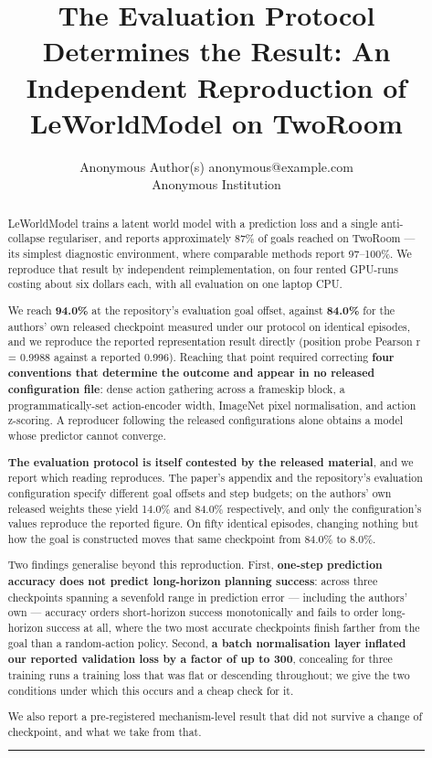 \documentclass[10pt]{article}
\title{The Evaluation Protocol Determines the Result: An Independent Reproduction of LeWorldModel on TwoRoom}
\author{\name Anonymous Author(s) \email anonymous@example.com \\
      \addr Anonymous Institution}
\begin{document}
\maketitle

\begin{abstract}
LeWorldModel trains a latent world model with a prediction loss and a single
anti-collapse regulariser, and reports approximately 87\% of goals reached on
TwoRoom --- its simplest diagnostic environment, where comparable methods report
97--100\%. We reproduce that result by independent reimplementation, on four
rented GPU-runs costing about six dollars each, with all evaluation on one
laptop CPU.

We reach \textbf{94.0\%} at the repository's evaluation goal offset, against \textbf{84.0\%}
for the authors' own released checkpoint measured under our protocol on
identical episodes, and we reproduce the reported representation result directly
(position probe Pearson r = 0.9988 against a reported 0.996). Reaching that
point required correcting \textbf{four conventions that determine the outcome and
appear in no released configuration file}: dense action gathering across a
frameskip block, a programmatically-set action-encoder width, ImageNet pixel
normalisation, and action z-scoring. A reproducer following the released
configurations alone obtains a model whose predictor cannot converge.

\textbf{The evaluation protocol is itself contested by the released material}, and we
report which reading reproduces. The paper's appendix and the repository's
evaluation configuration specify different goal offsets and step budgets; on the
authors' own released weights these yield 14.0\% and 84.0\% respectively, and only
the configuration's values reproduce the reported figure. On fifty identical
episodes, changing nothing but how the goal is constructed moves that same
checkpoint from 84.0\% to 8.0\%.

Two findings generalise beyond this reproduction. First, \textbf{one-step prediction
accuracy does not predict long-horizon planning success}: across three
checkpoints spanning a sevenfold range in prediction error --- including the
authors' own --- accuracy orders short-horizon success monotonically and fails to
order long-horizon success at all, where the two most accurate checkpoints
finish farther from the goal than a random-action policy. Second, \textbf{a batch
normalisation layer inflated our reported validation loss by a factor of up to 300}, concealing for three training runs a training loss that was flat
or descending throughout; we give the two conditions under which this occurs and
a cheap check for it.

We also report a pre-registered mechanism-level result that did not survive a
change of checkpoint, and what we take from that.

\begin{center}\rule{0.5\linewidth}{0.5pt}\end{center}
\end{abstract}
\end{document}
